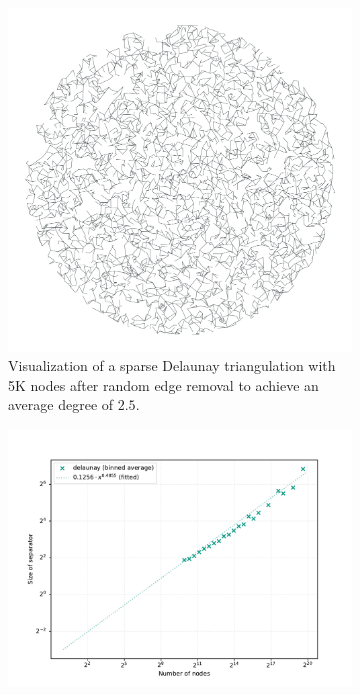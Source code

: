 \begin{figure}
	\centering
	\begin{subfigure}{0.35\linewidth}
		\centering
		\includegraphics[width=\linewidth]{graphics/delaunay_avg_deg.png}
		\caption{Visualization of a sparse Delaunay triangulation with 5K nodes after random edge removal to achieve an average degree of \(2.5\).}
		\label{fig:sparse_delaunay_viz}
	\end{subfigure}
	\hfill
	\begin{subfigure}{0.55\linewidth}
		\centering
		\includegraphics[width=\linewidth]{graphics/sep_delaunay_avg_deg.png}

\end{subfigure}
\end{figure}
